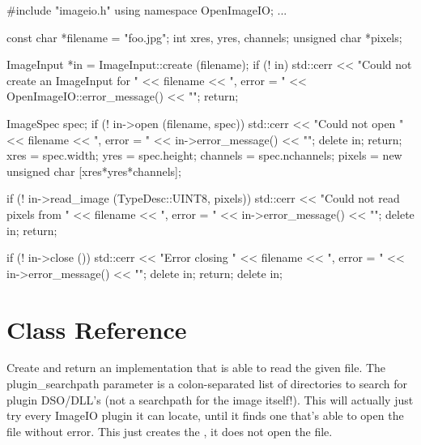 \begin{code}
        #include "imageio.h"
        using namespace OpenImageIO;
        ...

        const char *filename = "foo.jpg";
        int xres, yres, channels;
        unsigned char *pixels;

        ImageInput *in = ImageInput::create (filename);
        if (! in) {
            std::cerr << "Could not create an ImageInput for " 
                      << filename << ", error = " 
                      << OpenImageIO::error_message() << "\n";
            return;
        }

        ImageSpec spec;
        if (! in->open (filename, spec)) {
            std::cerr << "Could not open " << filename 
                      << ", error = " << in->error_message() << "\n";
            delete in;
            return;
        }
        xres = spec.width;
        yres = spec.height;
        channels = spec.nchannels;
        pixels = new unsigned char [xres*yres*channels];

        if (! in->read_image (TypeDesc::UINT8, pixels)) {
            std::cerr << "Could not read pixels from " << filename 
                      << ", error = " << in->error_message() << "\n";
            delete in;
            return;
        }

        if (! in->close ()) {
            std::cerr << "Error closing " << filename 
                      << ", error = " << in->error_message() << "\n";
            delete in;
            return;
        }
        delete in;
\end{code}



\section{\ImageInput Class Reference}
\label{sec:imageinput:reference}

Create and return an \ImageInput implementation that is able
to read the given file.  The {\kw plugin_searchpath} parameter is a
colon-separated list of directories to search for \product plugin
DSO/DLL's (not a searchpath for the image itself!).  This will
actually just try every ImageIO plugin it can locate, until it
finds one that's able to open the file without error.  This just
creates the \ImageInput, it does not open the file.
\apiend


